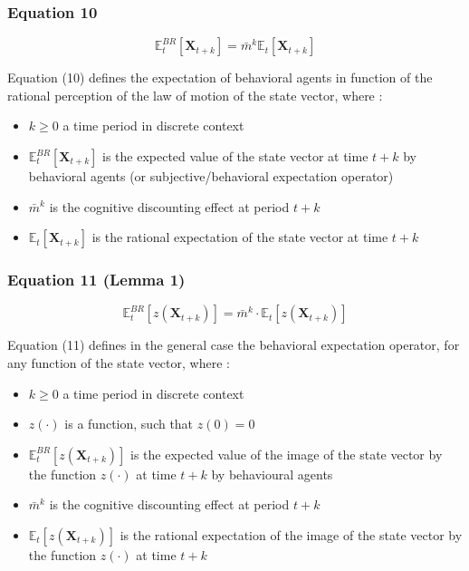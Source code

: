 \documentclass{article}
\begin{document}
\subsubsection*{Equation 10}

\begin{equation}\tag{10}
    \mathbb{E}_{t}^{BR}\left[\bm{X}_{t+k}\right]=\bar{m}^{k}\mathbb{E}_{t}\left[\bm{X}_{t+k}\right]
\end{equation}

Equation (10) defines the expectation of behavioral agents in function of the rational perception of the law of motion of the state vector, where : 
\begin{itemize}
    \item $k\geq 0$ a time period in discrete context
    \item $\mathbb{E}_{t}^{BR}\left[\bm{X}_{t+k}\right]$ is the expected value of the state vector at time $t+k$ by behavioral agents (or subjective/behavioral expectation operator)
    \item $\bar{m}^{k}$ is the cognitive discounting effect at period $t+k$
    \item $\mathbb{E}_{t}\left[\bm{X}_{t+k}\right]$ is the rational expectation of the state vector at time $t+k$
\end{itemize}

\subsubsection*{Equation 11 (Lemma 1)}

\begin{equation}\tag{11}
    \mathbb{E}_{t}^{BR}\left[z\left(\bm{X}_{t+k}\right)\right]=\bar{m}^{k}\cdot\mathbb{E}_{t}\left[z\left(\bm{X}_{t+k}\right)\right]
\end{equation}

Equation (11) defines in the general case the behavioral expectation operator, for any function of the state vector, where : 
\begin{itemize}
    \item $k\geq 0$ a time period in discrete context
    \item $z(\cdot)$ is a function, such that $z(0)=0$
    \item $\mathbb{E}_{t}^{BR}\left[z\left(\bm{X}_{t+k}\right)\right]$ is the expected value of the image of the state vector by the function $z(\cdot)$ at time $t+k$ by behavioural agents
    \item $\bar{m}^{k}$ is the cognitive discounting effect at period $t+k$
    \item $\mathbb{E}_{t}\left[z\left(\bm{X}_{t+k}\right)\right]$ is the rational expectation of the image of the state vector by the function $z(\cdot)$ at time $t+k$
\end{itemize}
\end{document}
